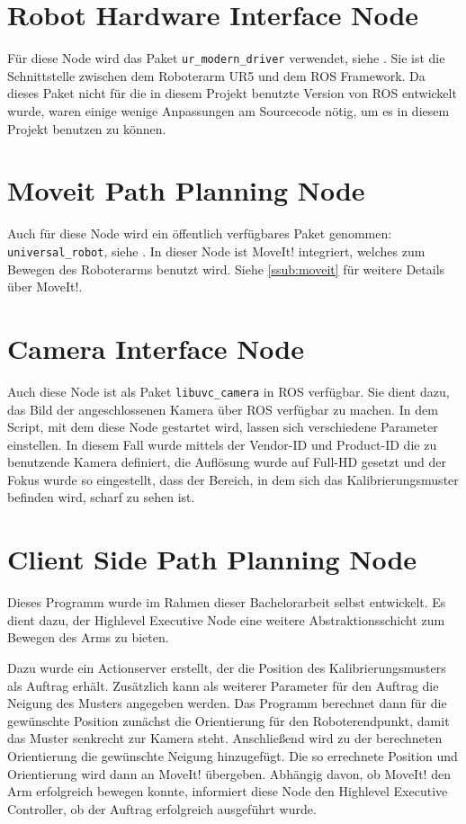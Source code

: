 \section{Robot Hardware Interface Node} %
\label{sec:ur_modern_driver}
Für diese Node wird das Paket \texttt{ur\_modern\_driver} verwendet, siehe \cite{ur_modern_driver}. Sie ist die Schnittstelle zwischen dem Roboterarm UR5 und dem ROS Framework. Da dieses Paket nicht für die in diesem Projekt benutzte Version von ROS entwickelt wurde, waren einige wenige Anpassungen am Sourcecode nötig, um es in diesem Projekt benutzen zu können.

\section{Moveit Path Planning Node} %
\label{sec:universal_robot}
Auch für diese Node wird ein öffentlich verfügbares Paket genommen: \texttt{universal\_robot}, siehe \cite{universal_robot}. In dieser Node ist MoveIt! integriert, welches zum Bewegen des Roboterarms benutzt wird. Siehe \autoref{ssub:moveit} für weitere Details über MoveIt!.

\section{Camera Interface Node} %
\label{sec:libuvc_camera}
Auch diese Node ist als Paket \texttt{libuvc\_camera} in ROS verfügbar. Sie dient dazu, das Bild der angeschlossenen Kamera über ROS verfügbar zu machen. In dem Script, mit dem diese Node gestartet wird, lassen sich verschiedene Parameter einstellen. In diesem Fall wurde mittels der Vendor-ID und Product-ID die zu benutzende Kamera definiert, die Auflösung wurde auf Full-HD gesetzt und der Fokus wurde so eingestellt, dass der Bereich, in dem sich das Kalibrierungsmuster befinden wird, scharf zu sehen ist.

\section{Client Side Path Planning Node} %
\label{sec:movearmserver}
Dieses Programm wurde im Rahmen dieser Bachelorarbeit selbst entwickelt. Es dient dazu, der Highlevel Executive Node eine weitere Abstraktionsschicht zum Bewegen des Arms zu bieten.

Dazu wurde ein Actionserver erstellt, der die Position des Kalibrierungsmusters als Auftrag erhält. Zusätzlich kann als weiterer Parameter für den Auftrag die Neigung des Musters angegeben werden. Das Programm berechnet dann für die gewünschte Position zunächst die Orientierung für den Roboterendpunkt, damit das Muster senkrecht zur Kamera steht. Anschließend wird zu der berechneten Orientierung die gewünschte Neigung hinzugefügt. Die so errechnete Position und Orientierung wird dann an MoveIt! übergeben. Abhängig davon, ob MoveIt! den Arm erfolgreich bewegen konnte, informiert diese Node den Highlevel Executive Controller, ob der Auftrag erfolgreich ausgeführt wurde.

